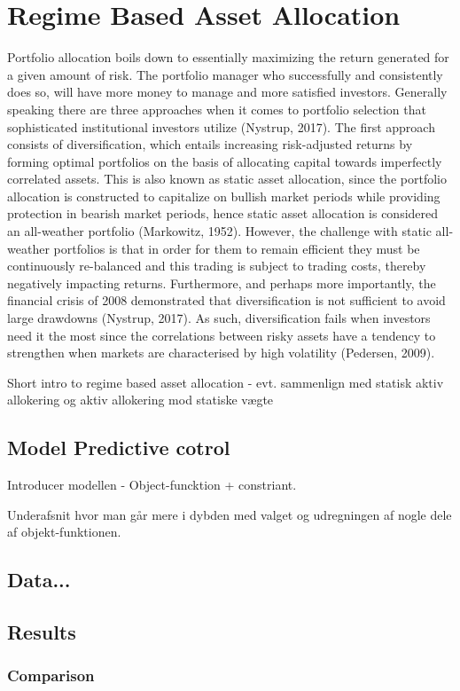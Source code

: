 \newpage

\section{Regime Based Asset Allocation}
Portfolio allocation boils down to essentially maximizing the return generated for a given amount of risk. The portfolio manager who successfully and consistently does so, will have more money to manage and more satisfied investors. Generally speaking there are three approaches when it comes to portfolio selection that sophisticated institutional investors utilize (Nystrup, 2017). The first approach consists of diversification, which entails increasing risk-adjusted returns by forming optimal portfolios on the basis of allocating capital towards imperfectly correlated assets. This is also known as static asset allocation, since the portfolio allocation is constructed to capitalize on bullish market periods while providing protection in bearish market periods, hence static asset allocation is considered an all-weather portfolio (Markowitz, 1952). However, the challenge with static all-weather portfolios is that in order for them to remain efficient they must be continuously re-balanced and this trading is subject to trading costs, thereby negatively impacting returns. Furthermore, and perhaps more importantly, the financial crisis of 2008 demonstrated that diversification is not sufficient to avoid large drawdowns (Nystrup, 2017). As such, diversification fails when investors need it the most since the correlations between risky assets have a tendency to strengthen when markets are characterised by high volatility (Pedersen, 2009).  


Short intro to regime based asset allocation - evt. sammenlign med statisk aktiv allokering og aktiv allokering mod statiske vægte

\subsection{Model Predictive cotrol}



Introducer modellen
- Object-funcktion + constriant.

Underafsnit hvor man går mere i dybden med valget og udregningen af nogle dele af objekt-funktionen.

\subsection{Data...}


\subsection{Results}




\subsubsection{Comparison}
